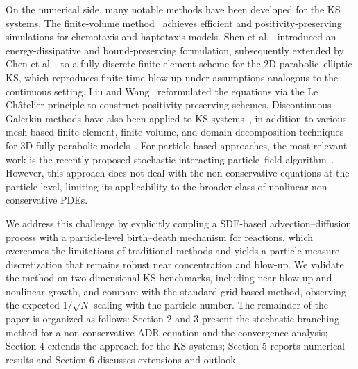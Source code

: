 \documentclass[a4paper,fleqn]{cas-sc}
\theoremstyle{definition}
\theoremstyle{remark}
\begin{document}
On the numerical side, many notable methods have been developed for the KS systems. The finite-volume method~\cite{filbet2006finite,chertock2008second,chertock2018high} achieves efficient and positivity-preserving simulations for chemotaxis and haptotaxis models.  
%
Shen et al.~\cite{shen2020unconditionally} introduced an energy-dissipative and bound-preserving formulation, subsequently extended by Chen et al.~\cite{chen2022error} to a fully discrete finite element scheme for the 2D parabolic–elliptic KS, which reproduces finite-time blow-up under assumptions analogous to the continuous setting. 
Liu and Wang~\cite{liu2018positivity} reformulated the equations via the Le Ch\^atelier principle to construct positivity-preserving schemes. Discontinuous Galerkin methods have also been applied to KS systems~\cite{zhong2024direct, li2017local,epshteyn2009new}, in addition to various mesh-based finite element, finite volume, and domain-decomposition techniques for 3D fully parabolic models~\cite{epshteyn2019efficient, strehl2013positivity}. For particle-based approaches, the most relevant work is the recently proposed stochastic interacting particle–field algorithm~\cite{wang2025novel,hu2024stochastic,chertock2025hybrid}. However, this approach does not deal with the non-conservative equations at the particle level, limiting its applicability to the broader class of nonlinear non-conservative PDEs. 

We address this challenge by explicitly coupling a SDE-based advection--diffusion process with a particle-level birth--death mechanism for reactions, which overcomes the limitations of traditional methods and yields a particle measure discretization that remains robust near concentration and blow-up. We validate the method on two-dimensional KS benchmarks, including near blow-up and nonlinear growth, and compare with the standard grid-based method, observing the expected $1/\sqrt{N}$ scaling with the particle number.
%
The remainder of the paper is organized as follows: Section 2  and 3 present the stochastic branching method for a non-conservative ADR equation and the convergence analysis; Section 4 extends the approach for the KS systems; Section 5 reports numerical results and Section 6 discusses extensions and outlook.

\end{document}
